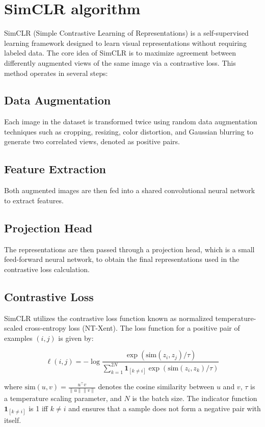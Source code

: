 \section{SimCLR algorithm}
SimCLR (Simple Contrastive Learning of Representations) is a self-supervised learning framework designed to learn visual representations without requiring labeled data. The core idea of SimCLR is to maximize agreement between differently augmented views of the same image via a contrastive loss. This method operates in several steps:

\subsection{Data Augmentation}
Each image in the dataset is transformed twice using random data augmentation techniques such as cropping, resizing, color distortion, and Gaussian blurring to generate two correlated views, denoted as positive pairs. 

\subsection{Feature Extraction}
Both augmented images are then fed into a shared convolutional neural network to extract features.

\subsection{Projection Head}
The representations are then passed through a projection head, which is a small feed-forward neural network, to obtain the final representations used in the contrastive loss calculation.

\subsection{Contrastive Loss}
SimCLR utilizes the contrastive loss function known as normalized temperature-scaled cross-entropy loss (NT-Xent). The loss function for a positive pair of examples $(i, j)$ is given by:

\begin{equation}
\ell(i, j) = -\log \frac{\exp(\text{sim}(z_i, z_j) / \tau)}{\sum_{k=1}^{2N} \mathbf{1}_{[k \neq i]} \exp(\text{sim}(z_i, z_k) / \tau)}
\end{equation}

where $\text{sim}(u, v) = \frac{u^\top v}{\|u\| \|v\|}$ denotes the cosine similarity between $u$ and $v$, $\tau$ is a temperature scaling parameter, and $N$ is the batch size. The indicator function $\mathbf{1}_{[k \neq i]}$ is 1 iff $k \neq i$ and ensures that a sample does not form a negative pair with itself.

